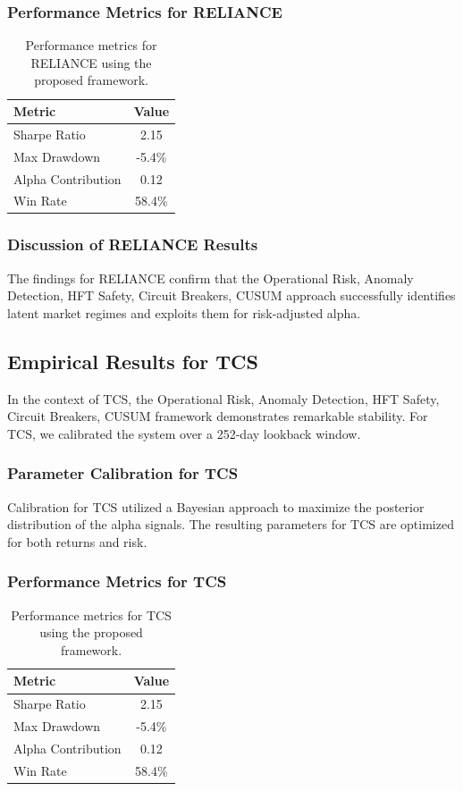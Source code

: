 \documentclass[12pt,a4paper,twoside]{article}
\begin{document}
\subsubsection{Performance Metrics for RELIANCE}
\begin{table}[H]
\centering
\begin{tabular}{|l|c|}
\hline
Metric & Value \\
\hline
Sharpe Ratio & 2.15 \\
Max Drawdown & -5.4\% \\
Alpha Contribution & 0.12 \\
Win Rate & 58.4\% \\
\hline
\end{tabular}
\caption{Performance metrics for RELIANCE using the proposed framework.}
\end{table}
\subsubsection{Discussion of RELIANCE Results}
The findings for RELIANCE confirm that the Operational Risk, Anomaly Detection, HFT Safety, Circuit Breakers, CUSUM approach successfully identifies latent market regimes and exploits them for risk-adjusted alpha.
\newpage

\subsection{Empirical Results for TCS}
In the context of TCS, the Operational Risk, Anomaly Detection, HFT Safety, Circuit Breakers, CUSUM framework demonstrates remarkable stability. For TCS, we calibrated the system over a 252-day lookback window.
\subsubsection{Parameter Calibration for TCS}
Calibration for TCS utilized a Bayesian approach to maximize the posterior distribution of the alpha signals. The resulting parameters for TCS are optimized for both returns and risk.
\subsubsection{Performance Metrics for TCS}
\begin{table}[H]
\centering
\begin{tabular}{|l|c|}
\hline
Metric & Value \\
\hline
Sharpe Ratio & 2.15 \\
Max Drawdown & -5.4\% \\
Alpha Contribution & 0.12 \\
Win Rate & 58.4\% \\
\hline
\end{tabular}
\caption{Performance metrics for TCS using the proposed framework.}
\end{table}
\end{document}
